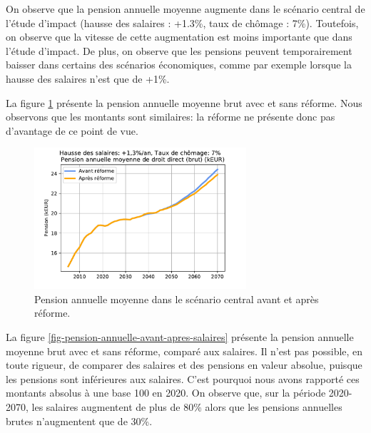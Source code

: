 \documentclass[10pt]{article}
\begin{document}
On observe que la pension annuelle moyenne augmente dans le scénario central de 
l'étude d'impact (hausse des salaires : +1.3\%, taux de chômage : 7\%). 
Toutefois, on observe que la vitesse de cette augmentation est moins importante 
que dans l'étude d'impact. 
De plus, on observe que les pensions peuvent temporairement baisser dans certains 
des scénarios économiques, comme par exemple lorsque la hausse des salaires n'est que 
de +1\%. 

La figure \ref{fig-pension-annuelle-simulation-vs-COR} présente la pension 
annuelle moyenne brut avec et sans réforme. 
Nous observons que les montants sont similaires: la réforme ne présente donc pas 
d'avantage de ce point de vue. 

\begin{figure}
\begin{center}
\includegraphics[width=0.7\textwidth]{Simulation-pension-annuelle-moyenne-3.pdf}
\end{center}
\caption{Pension annuelle moyenne dans le scénario central 
avant et après réforme.}
\label{fig-pension-annuelle-simulation-vs-COR}
\end{figure}

La figure \ref{fig-pension-annuelle-avant-apres-salaires} présente la pension 
annuelle moyenne brut avec et sans réforme, comparé aux salaires. 
Il n'est pas possible, en toute rigueur, de comparer des salaires et 
des pensions en valeur absolue, puisque les pensions sont inférieures aux 
salaires. 
C'est pourquoi nous avons rapporté ces montants absolus à une base 100 en 2020.  
On observe que, sur la période 2020-2070, les salaires augmentent de plus de 80\% 
alors que les pensions annuelles brutes n'augmentent que de 30\%. 
\end{document}
